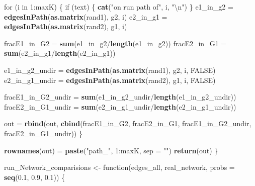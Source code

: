 \documentclass[]{article}
\newenvironment{Shaded}{\begin{snugshade}}{\end{snugshade}}
\newcommand{\KeywordTok}[1]{\textcolor[rgb]{0.13,0.29,0.53}{\textbf{{#1}}}}
\newcommand{\DataTypeTok}[1]{\textcolor[rgb]{0.13,0.29,0.53}{{#1}}}
\newcommand{\DecValTok}[1]{\textcolor[rgb]{0.00,0.00,0.81}{{#1}}}
\newcommand{\FloatTok}[1]{\textcolor[rgb]{0.00,0.00,0.81}{{#1}}}
\newcommand{\CharTok}[1]{\textcolor[rgb]{0.31,0.60,0.02}{{#1}}}
\newcommand{\StringTok}[1]{\textcolor[rgb]{0.31,0.60,0.02}{{#1}}}
\newcommand{\OtherTok}[1]{\textcolor[rgb]{0.56,0.35,0.01}{{#1}}}
\newcommand{\NormalTok}[1]{{#1}}
\begin{document}
\begin{Shaded}
\begin{Highlighting}[]
    \NormalTok{for (i in }\DecValTok{1}\NormalTok{:maxK) \{}
        \NormalTok{if (text) \{}
            \KeywordTok{cat}\NormalTok{(}\StringTok{"on run path of"}\NormalTok{, i, }\StringTok{"}\CharTok{\textbackslash{}n}\StringTok{"}\NormalTok{)}
        \NormalTok{\}}
        \NormalTok{e1_in_g2 =}\StringTok{ }\KeywordTok{edgesInPath}\NormalTok{(}\KeywordTok{as.matrix}\NormalTok{(rand1), g2, i)}
        \NormalTok{e2_in_g1 =}\StringTok{ }\KeywordTok{edgesInPath}\NormalTok{(}\KeywordTok{as.matrix}\NormalTok{(rand2), g1, i)}
        
        \NormalTok{fracE1_in_G2 =}\StringTok{ }\KeywordTok{sum}\NormalTok{(e1_in_g2/}\KeywordTok{length}\NormalTok{(e1_in_g2))}
        \NormalTok{fracE2_in_G1 =}\StringTok{ }\KeywordTok{sum}\NormalTok{(e2_in_g1/}\KeywordTok{length}\NormalTok{(e2_in_g1))}
        
        \NormalTok{e1_in_g2_undir =}\StringTok{ }\KeywordTok{edgesInPath}\NormalTok{(}\KeywordTok{as.matrix}\NormalTok{(rand1), g2, i, }
            \OtherTok{FALSE}\NormalTok{)}
        \NormalTok{e2_in_g1_undir =}\StringTok{ }\KeywordTok{edgesInPath}\NormalTok{(}\KeywordTok{as.matrix}\NormalTok{(rand2), g1, i, }
            \OtherTok{FALSE}\NormalTok{)}
        
        \NormalTok{fracE1_in_G2_undir =}\StringTok{ }\KeywordTok{sum}\NormalTok{(e1_in_g2_undir/}\KeywordTok{length}\NormalTok{(e1_in_g2_undir))}
        \NormalTok{fracE2_in_G1_undir =}\StringTok{ }\KeywordTok{sum}\NormalTok{(e2_in_g1_undir/}\KeywordTok{length}\NormalTok{(e2_in_g1_undir))}
        
        \NormalTok{out =}\StringTok{ }\KeywordTok{rbind}\NormalTok{(out, }\KeywordTok{cbind}\NormalTok{(fracE1_in_G2, fracE2_in_G1, fracE1_in_G2_undir, }
            \NormalTok{fracE2_in_G1_undir))}
    \NormalTok{\}}
    
    \KeywordTok{rownames}\NormalTok{(out) =}\StringTok{ }\KeywordTok{paste}\NormalTok{(}\StringTok{"path_"}\NormalTok{, }\DecValTok{1}\NormalTok{:maxK, }\DataTypeTok{sep =} \StringTok{""}\NormalTok{)}
    \KeywordTok{return}\NormalTok{(out)}
\NormalTok{\}}

\NormalTok{run_Network_comparisions <-}\StringTok{ }\NormalTok{function(edges_all, real_network, }
    \DataTypeTok{probs =} \KeywordTok{seq}\NormalTok{(}\FloatTok{0.1}\NormalTok{, }\FloatTok{0.9}\NormalTok{, }\FloatTok{0.1}\NormalTok{)) \{}
    

\end{Highlighting}
\end{Shaded}
\end{document}
